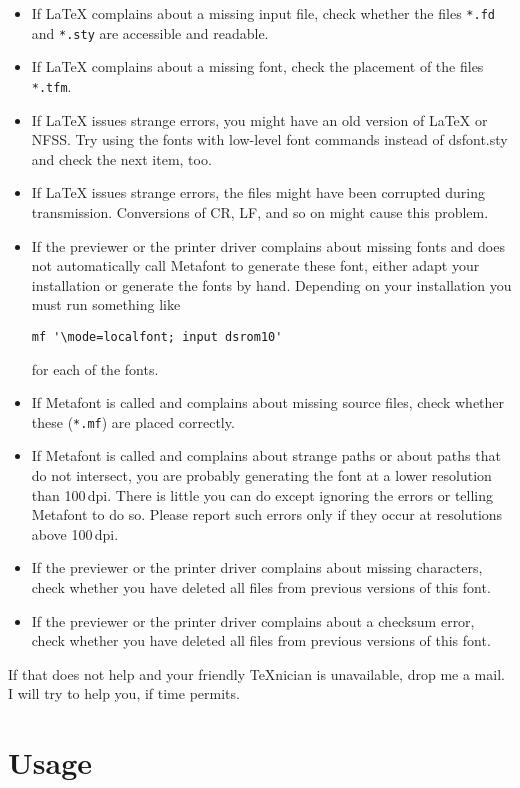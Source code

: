 \documentclass[a4paper]{article}
\newcommand{\MF}{\textsf{Metafont}}
\begin{document}
\begin{itemize}
\item  If \LaTeX{} complains about a missing input file, check whether
    the files \texttt{*.fd} and \texttt{*.sty} are accessible and readable.
\item  If \LaTeX{} complains about a missing font, check the
    placement of the files \texttt{*.tfm}.
\item  If \LaTeX{} issues strange errors, you might have an old version
    of \LaTeX{} or NFSS. Try using the fonts with low-level font
    commands instead of dsfont.sty and check the next item, too.
\item  If \LaTeX{} issues strange errors, the files might have been
    corrupted during transmission. Conversions of CR, LF, and
    so on might cause this problem.
\item  If the previewer or the printer driver complains about missing
    fonts and does not automatically call \MF{} to generate
    these font, either adapt your installation or generate
    the fonts by hand. Depending on your installation you
    must run something like
\begin{verbatim}
mf '\mode=localfont; input dsrom10'
\end{verbatim}
    for each of the fonts.
\item  If \MF{} is called and complains about missing source
    files, check whether these (\texttt{*.mf}) are placed
    correctly.
\item  If \MF{} is called and complains about strange paths
    or about paths that do not intersect, you are probably
    generating the font at a lower resolution than 100\,dpi.
    There is little you can do except ignoring the errors or
    telling \MF{} to do so. Please report such errors only
    if they occur at resolutions above 100\,dpi.
\item  If the previewer or the printer driver complains about missing
    characters, check whether you have deleted all files from
    previous versions of this font.
\item  If the previewer or the printer driver complains about a
    checksum error, check whether you have deleted all files from
    previous versions of this font.
\end{itemize}

If that does not help and your friendly \TeX nician is unavailable,
drop me a mail. I will try to help you, if time permits.


\section{Usage}
\end{document}
